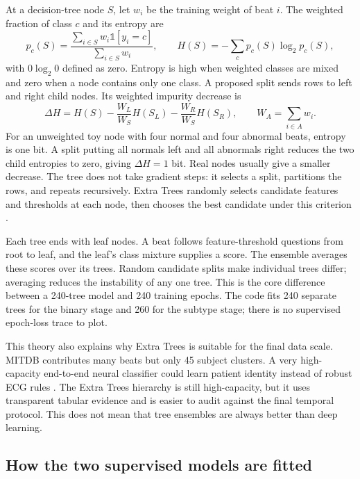 At a decision-tree node $S$, let $w_i$ be the training weight of beat $i$.
The weighted fraction of class $c$ and its entropy are
\begin{equation}
 p_c(S)=\frac{\sum_{i\in S}w_i\mathbb{1}[y_i=c]}
 {\sum_{i\in S}w_i},\qquad
 H(S)=-\sum_c p_c(S)\log_2 p_c(S),
 \label{eq:theory-weighted-entropy}
\end{equation}
with $0\log_2 0$ defined as zero. Entropy is high when weighted classes are
mixed and zero when a node contains only one class. A proposed split sends
rows to left and right child nodes. Its weighted impurity decrease is
\begin{equation}
 \Delta H=H(S)-\frac{W_L}{W_S}H(S_L)
                 -\frac{W_R}{W_S}H(S_R),
 \qquad W_A=\sum_{i\in A}w_i.
 \label{eq:theory-information-gain}
\end{equation}
For an unweighted toy node with four normal and four abnormal beats, entropy
is one bit. A split putting all normals left and all abnormals right reduces
the two child entropies to zero, giving $\Delta H=1$ bit. Real nodes usually
give a smaller decrease. The tree does not take gradient steps: it selects a
split, partitions the rows, and repeats recursively. Extra Trees randomly
selects candidate features and thresholds at each node, then chooses the
best candidate under this criterion \cite{geurts2006extratrees}.

Each tree ends with leaf nodes. A beat follows feature-threshold questions
from root to leaf, and the leaf's class mixture supplies a score. The ensemble
averages these scores over its trees. Random candidate splits make individual
trees differ; averaging reduces the instability of any one tree. This is the
core difference between a 240-tree model and 240 training epochs. The code
fits 240 separate trees for the binary stage and 260 for the subtype stage;
there is no supervised epoch-loss trace to plot.

This theory also explains why Extra Trees is suitable for the final data scale.
MITDB contributes many beats but only 45 subject clusters. A very high-capacity
end-to-end neural classifier could learn patient identity instead of robust ECG
rules \cite{zhang2021interpatient}. The Extra Trees hierarchy is still
high-capacity, but it uses transparent tabular evidence and is easier to audit
against the final temporal protocol. This does not mean that tree ensembles are
always better than deep learning.

\subsection{How the two supervised models are fitted}

